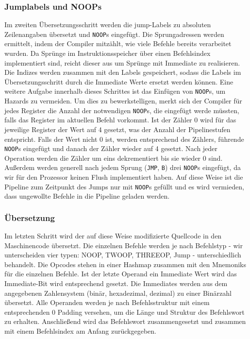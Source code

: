 \documentclass[paper=a4,fontsize=11pt,twocolumn]{scrreprt}
\begin{document}
\subsubsection{Jumplabels und NOOPs}
Im zweiten Übersetzungsschritt werden die jump-Labels zu absoluten Zeilenangaben übersetzt und \texttt{NOOP}s eingefügt.
Die Sprungadressen werden ermittelt, indem der Compiler mitzählt, wie viele Befehle bereits verarbeitet wurden.
Da Sprünge im Instruktionsspeicher über einen Befehlsindex implementiert sind, reicht dieser aus um Sprünge mit Immediate zu realisieren.
Die Indizes werden zusammen mit den Labels gespeichert, sodass die Labels im Übersetzungsschritt durch die Immediate Werte ersetzt werden können.
Eine weitere Aufgabe innerhalb dieses Schrittes ist das Einfügen von \texttt{NOOP}s, um Hazards zu vermeiden.
Um dies zu bewerkstelligen, merkt sich der Compiler für jedes Register die Anzahl der notwendigen \texttt{NOOP}s, die eingefügt werde müssten, falls das Register im aktuellen Befehl vorkommt.
Ist der Zähler 0 wird für das jeweilige Register der Wert auf 4 gesetzt, was der Anzahl der Pipelinestufen entspricht.
Falls der Wert nicht 0 ist, werden entsprechend des Zählers, führende \texttt{NOOP}s eingefügt und danach der Zähler wieder auf 4 gesetzt.
Nach jeder Operation werden die Zähler um eins dekrementiert bis sie wieder 0 sind.
Außerdem werden generell nach jedem Sprung (\texttt{JMP}, \texttt{B}) drei \texttt{NOOP}s eingefügt, da wir für den Prozessor keinen Flush implementiert haben. 
Auf diese Weise ist die Pipeline zum Zeitpunkt des Jumps nur mit \texttt{NOOP}s gefüllt und es wird vermieden, dass ungewollte Befehle in die Pipeline geladen werden.

\subsubsection{Übersetzung}
Im letzten Schritt wird der auf diese Weise modifizierte Quellcode in den Maschinencode übersetzt.
Die einzelnen Befehle werden je nach Befehlstyp - wir unterscheiden vier typen: NOOP, TWOOP, THREEOP, Jump - unterschiedlich behandelt.
Die Opcodes stehen in einer Hashmap zusammen mit den Mnemoniks für die einzelnen Befehle.
Ist der letzte Operand ein Immediate Wert wird das Immediate-Bit wird entsprechend gesetzt.
Die Immediates werden aus dem angegebenen Zahlensystem (binär, hexadezimal, dezimal) zu einer Binärzahl übersetzt.
Alle Operanden werden je nach Befehlsstruktur mit einem entsprechenden 0 Padding versehen, um die Länge und Struktur des Befehlswort zu erhalten.
Anschließend wird das Befehlswort zusammengesetzt und zusammen mit einem Befehlsindex am Anfang zurückgegeben.
\end{document}
